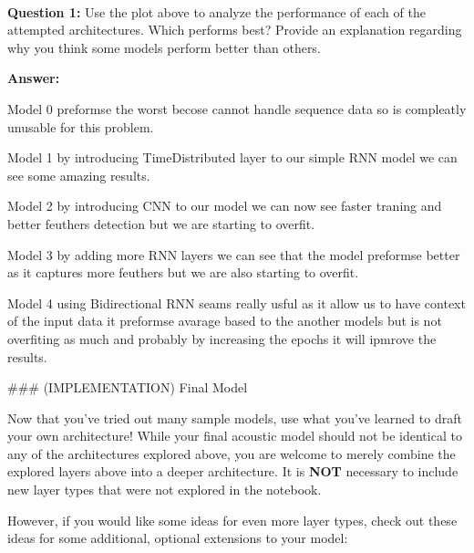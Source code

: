 \documentclass[11pt]{article}
\begin{document}
    \begin{center}
    \end{center}
    { \hspace*{\fill} \\}
    
    \textbf{Question 1:} Use the plot above to analyze the performance of
each of the attempted architectures. Which performs best? Provide an
explanation regarding why you think some models perform better than
others.

\textbf{Answer:}

Model 0 preformse the worst becose cannot handle sequence data so is
compleatly unusable for this problem.

Model 1 by introducing TimeDistributed layer to our simple RNN model we
can see some amazing results.

Model 2 by introducing CNN to our model we can now see faster traning
and better feuthers detection but we are starting to overfit.

Model 3 by adding more RNN layers we can see that the model preformse
better as it captures more feuthers but we are also starting to overfit.

Model 4 using Bidirectional RNN seams really usful as it allow us to
have context of the input data it preformse avarage based to the another
models but is not overfiting as much and probably by increasing the
epochs it will ipmrove the results.

     \#\#\# (IMPLEMENTATION) Final Model

Now that you've tried out many sample models, use what you've learned to
draft your own architecture! While your final acoustic model should not
be identical to any of the architectures explored above, you are welcome
to merely combine the explored layers above into a deeper architecture.
It is \textbf{NOT} necessary to include new layer types that were not
explored in the notebook.

However, if you would like some ideas for even more layer types, check
out these ideas for some additional, optional extensions to your model:
\end{document}
